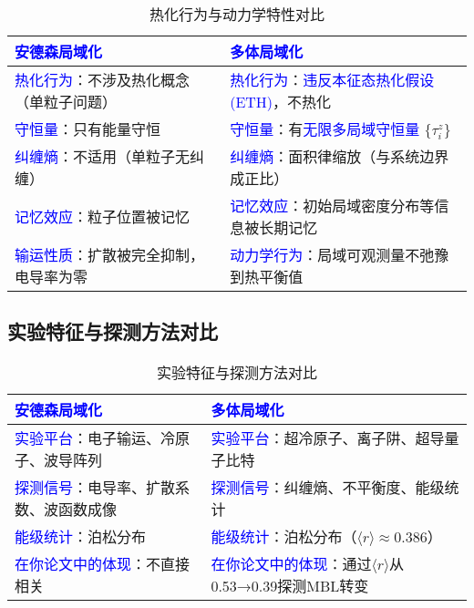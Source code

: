 \documentclass[11pt,a4paper]{article}
\begin{document}
\begin{table}[H]
\centering
\caption{热化行为与动力学特性对比}
\begin{tabular}{|p{}|p{}|}
\hline
\textcolor{blue}{安德森局域化} & \textcolor{blue}{多体局域化} \\
\hline
\hline
\textcolor{blue}{热化行为}：不涉及热化概念（单粒子问题） & \textcolor{blue}{热化行为}：\textcolor{blue}{违反本征态热化假设(ETH)}，不热化 \\
\hline
\textcolor{blue}{守恒量}：只有能量守恒 & \textcolor{blue}{守恒量}：有\textcolor{blue}{无限多局域守恒量} $\{\tau_i^z\}$ \\
\hline
\textcolor{blue}{纠缠熵}：不适用（单粒子无纠缠） & \textcolor{blue}{纠缠熵}：面积律缩放（与系统边界成正比） \\
\hline
\textcolor{blue}{记忆效应}：粒子位置被记忆 & \textcolor{blue}{记忆效应}：初始局域密度分布等信息被长期记忆 \\
\hline
\textcolor{blue}{输运性质}：扩散被完全抑制，电导率为零 & \textcolor{blue}{动力学行为}：局域可观测量不弛豫到热平衡值 \\
\hline
\end{tabular}
\end{table}

\subsection{实验特征与探测方法对比}

\begin{table}[H]
\centering
\caption{实验特征与探测方法对比}
\begin{tabular}{|p{}|p{}|}
\hline
\textcolor{blue}{安德森局域化} & \textcolor{blue}{多体局域化} \\
\hline
\hline
\textcolor{blue}{实验平台}：电子输运、冷原子、波导阵列 & \textcolor{blue}{实验平台}：超冷原子、离子阱、超导量子比特 \\
\hline
\textcolor{blue}{探测信号}：电导率、扩散系数、波函数成像 & \textcolor{blue}{探测信号}：纠缠熵、不平衡度、能级统计 \\
\hline
\textcolor{blue}{能级统计}：泊松分布 & \textcolor{blue}{能级统计}：泊松分布（$\langle r \rangle \approx 0.386$） \\
\hline
\textcolor{blue}{在你论文中的体现}：不直接相关 & \textcolor{blue}{在你论文中的体现}：通过$\langle r \rangle$从0.53→0.39探测MBL转变 \\
\hline
\end{tabular}
\end{table}
\end{document}
